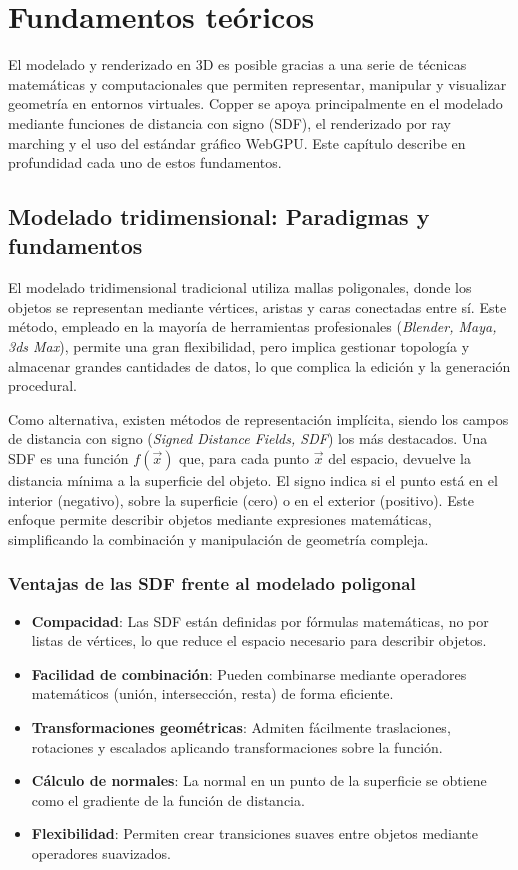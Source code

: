 \chapter{Fundamentos teóricos}

El modelado y renderizado en 3D es posible gracias a una serie de técnicas
matemáticas y computacionales que permiten representar, manipular y visualizar
geometría en entornos virtuales. Copper se apoya principalmente en el modelado
mediante funciones de distancia con signo (SDF), el renderizado por ray
marching y el uso del estándar gráfico WebGPU. Este capítulo describe en
profundidad cada uno de estos fundamentos.

\section{Modelado tridimensional: Paradigmas y fundamentos}

El modelado tridimensional tradicional utiliza mallas poligonales, donde los
objetos se representan mediante vértices, aristas y caras conectadas entre sí.
Este método, empleado en la mayoría de herramientas profesionales
(\textit{Blender, Maya, 3ds Max}), permite una gran flexibilidad, pero implica
gestionar topología y almacenar grandes cantidades de datos, lo que complica la
edición y la generación procedural.

Como alternativa, existen métodos de representación implícita, siendo los
campos de distancia con signo (\textit{Signed Distance Fields, SDF}) los más
destacados. Una SDF es una función $f(\vec{x})$ que, para cada punto $\vec{x}$
del espacio, devuelve la distancia mínima a la superficie del objeto. El signo
indica si el punto está en el interior (negativo), sobre la superficie (cero) o
en el exterior (positivo). Este enfoque permite describir objetos mediante
expresiones matemáticas, simplificando la combinación y manipulación de
geometría compleja.

\subsection{Ventajas de las SDF frente al modelado poligonal}

\begin{itemize}
    \item \textbf{Compacidad}: Las SDF están definidas por fórmulas matemáticas, no por listas de vértices, lo que reduce el espacio necesario para describir objetos.
    \item \textbf{Facilidad de combinación}: Pueden combinarse mediante operadores matemáticos (unión, intersección, resta) de forma eficiente.
    \item \textbf{Transformaciones geométricas}: Admiten fácilmente traslaciones, rotaciones y escalados aplicando transformaciones sobre la función.
    \item \textbf{Cálculo de normales}: La normal en un punto de la superficie se obtiene como el gradiente de la función de distancia.
    \item \textbf{Flexibilidad}: Permiten crear transiciones suaves entre objetos mediante operadores suavizados.
\end{itemize}

